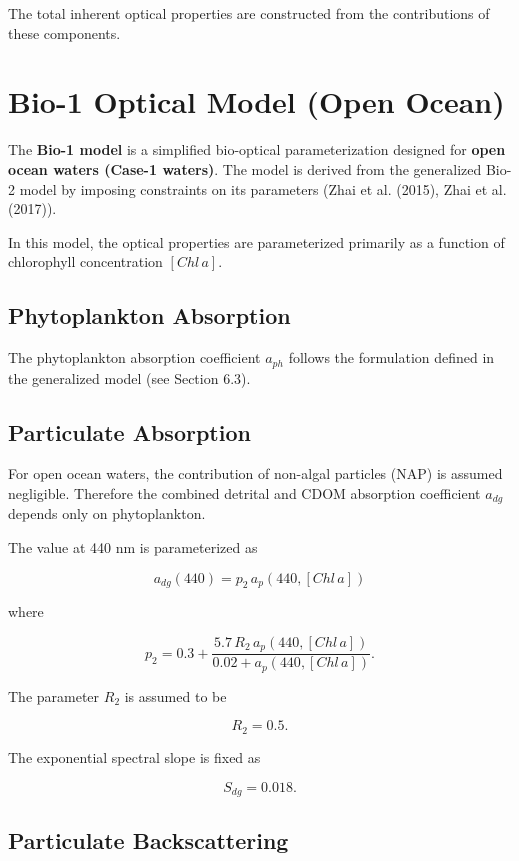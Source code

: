\documentclass[
  11pt,
  letterpaper,
  DIV=11,
  numbers=noendperiod]{scrreprt}
\begin{document}
The total inherent optical properties are constructed from the
contributions of these components.

\section{Bio-1 Optical Model (Open
Ocean)}\label{bio-1-optical-model-open-ocean}

The \textbf{Bio-1 model} is a simplified bio-optical parameterization
designed for \textbf{open ocean waters (Case-1 waters)}. The model is
derived from the generalized Bio-2 model by imposing constraints on its
parameters (Zhai et al. (2015), Zhai et al. (2017)).

In this model, the optical properties are parameterized primarily as a
function of chlorophyll concentration \([Chl\,a]\).

\subsection{Phytoplankton Absorption}\label{phytoplankton-absorption}

The phytoplankton absorption coefficient \(a_{ph}\) follows the
formulation defined in the generalized model (see Section 6.3).

\subsection{Particulate Absorption}\label{particulate-absorption}

For open ocean waters, the contribution of non-algal particles (NAP) is
assumed negligible. Therefore the combined detrital and CDOM absorption
coefficient \(a_{dg}\) depends only on phytoplankton.

The value at 440 nm is parameterized as

\[
a_{dg}(440) = p_2\, a_p(440,[Chl\,a])
\]

where

\[
p_2 = 0.3 + \frac{5.7\,R_2\,a_p(440,[Chl\,a])}{0.02 + a_p(440,[Chl\,a])}.
\]

The parameter \(R_2\) is assumed to be

\[
R_2 = 0.5.
\]

The exponential spectral slope is fixed as

\[
S_{dg} = 0.018.
\]

\subsection{Particulate
Backscattering}\label{particulate-backscattering}
\end{document}
